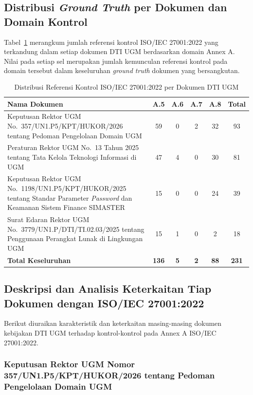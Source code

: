 \subsection{Distribusi \textit{Ground Truth} per Dokumen dan Domain Kontrol}

Tabel~\ref{tbl:dti_distribusi} merangkum jumlah referensi kontrol ISO/IEC 27001:2022 yang terkandung dalam setiap dokumen DTI UGM berdasarkan domain Annex A. Nilai pada setiap sel merupakan jumlah kemunculan referensi kontrol pada domain tersebut dalam keseluruhan \textit{ground truth} dokumen yang bersangkutan.

\begin{table}[H]
	\centering
	\caption{Distribusi Referensi Kontrol ISO/IEC 27001:2022 per Dokumen DTI UGM}
	\label{tbl:dti_distribusi}
	\small
	\begin{tabular}{|>{\raggedright\arraybackslash}p{7.8cm}|c|c|c|c|c|}
		\hline
		\textbf{Nama Dokumen} & \textbf{A.5} & \textbf{A.6} & \textbf{A.7} & \textbf{A.8} & \textbf{Total} \\
		\hline
		Keputusan Rektor UGM No.~357/UN1.P5/KPT/HUKOR/2026 tentang Pedoman Pengelolaan Domain UGM & 59 & 0 & 2 & 32 & 93 \\
		\hline
		Peraturan Rektor UGM No.~13 Tahun 2025 tentang Tata Kelola Teknologi Informasi di UGM & 47 & 4 & 0 & 30 & 81 \\
		\hline
		Keputusan Rektor UGM No.~1198/UN1.P5/KPT/HUKOR/2025 tentang Standar Parameter \textit{Password} dan Keamanan Sistem Finance SIMASTER & 15 & 0 & 0 & 24 & 39 \\
		\hline
		Surat Edaran Rektor UGM No.~3779/UN1.P/DTI/TI.02.03/2025 tentang Penggunaan Perangkat Lunak di Lingkungan UGM & 15 & 1 & 0 & 2 & 18 \\
		\hline
		\textbf{Total Keseluruhan} & \textbf{136} & \textbf{5} & \textbf{2} & \textbf{88} & \textbf{231} \\
		\hline
	\end{tabular}
\end{table}

\subsection{Deskripsi dan Analisis Keterkaitan Tiap Dokumen dengan ISO/IEC 27001:2022}

Berikut diuraikan karakteristik dan keterkaitan masing-masing dokumen kebijakan DTI UGM terhadap kontrol-kontrol pada Annex A ISO/IEC 27001:2022.

\subsubsection{Keputusan Rektor UGM Nomor 357/UN1.P5/KPT/HUKOR/2026 tentang Pedoman Pengelolaan Domain UGM}

